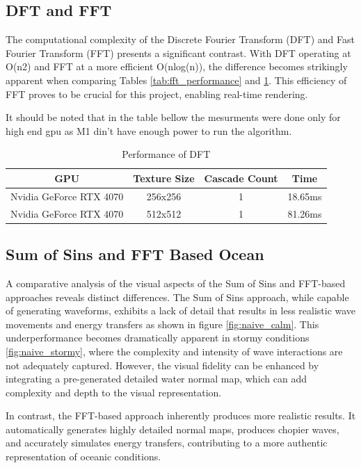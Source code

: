 \subsection{DFT and FFT}
The computational complexity of the Discrete Fourier Transform (DFT) and Fast Fourier Transform (FFT) presents a significant contrast. With DFT operating at O(n2) and FFT at a more efficient O(nlog(n)), the difference becomes strikingly apparent when comparing Tables \ref{tab:fft_performance} and \ref{tab:dft_ocean}. This efficiency of FFT proves to be crucial for this project, enabling real-time rendering.

It should be noted that in the table bellow the mesurments were done only for high end gpu as M1 din't have enough power to run the algorithm.

\begin{table}[h]
    \centering
    \begin{tabular}{|c|c|c|c|}
        \hline
        \textbf{GPU} & \textbf{Texture Size} & \textbf{Cascade Count} & \textbf{Time} \\
        \hline
        Nvidia GeForce RTX 4070 & 256x256 & 1 & 18.65ms \\
        \hline
        Nvidia GeForce RTX 4070 & 512x512 & 1 & 81.26ms \\
        \hline
    \end{tabular}
    \caption{Performance of DFT}
    \label{tab:dft_ocean}
\end{table}

\subsection{Sum of Sins and FFT Based Ocean}
A comparative analysis of the visual aspects of the Sum of Sins and FFT-based approaches reveals distinct differences. The Sum of Sins approach, while capable of generating waveforms, exhibits a lack of detail that results in less realistic wave movements and energy transfers as shown in figure \ref{fig:naive_calm}. This underperformance becomes dramatically apparent in stormy conditions \ref{fig:naive_stormy}, where the complexity and intensity of wave interactions are not adequately captured. However, the visual fidelity can be enhanced by integrating a pre-generated detailed water normal map, which can add complexity and depth to the visual representation.

In contrast, the FFT-based approach inherently produces more realistic results. It automatically generates highly detailed normal maps, produces chopier waves, and accurately simulates energy transfers, contributing to a more authentic representation of oceanic conditions.

